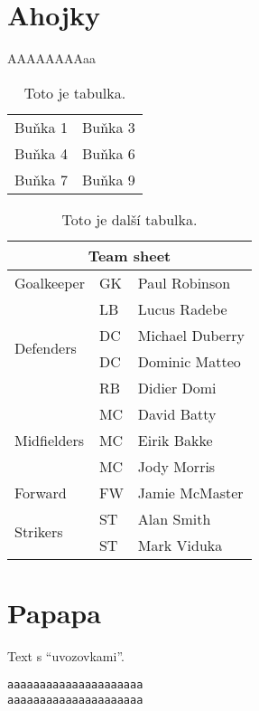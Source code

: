 \documentclass[a4paper,12pt]{article}
\begin{document}
\upmaketitle
\upthanksanot
\uptableofcontents
\upprintlists

\section{Ahojky}
AAAAAAAAaa

\begin{table}[ht]
  \begin{center}
    \begin{tabular}{||l|r||}
      Buňka 1 & Buňka 3 \\
      Buňka 4 & Buňka 6 \\
      Buňka 7 & Buňka 9 \\
      \hline
    \end{tabular}
    \caption{Toto je tabulka.}
  \end{center}
\end{table}
\begin{table}
\begin{center}
\begin{tabular}{|l|l|l|}
\hline
\multicolumn{3}{|c|}{Team sheet} \\
\hline
 Goalkeeper & GK & Paul Robinson \\ \hline
\multirow{4}{*}{Defenders} & LB & Lucus Radebe \\
  & DC & Michael Duberry \\
  & DC & Dominic Matteo \\
  & RB & Didier Domi \\ \hline
\multirow{3}{*}{Midfielders} & MC & David Batty \\
  & MC & Eirik Bakke \\
  & MC & Jody Morris \\ \hline
 Forward & FW & Jamie McMaster \\ \hline
\multirow{2}{*}{Strikers} & ST & Alan Smith \\
  & ST & Mark Viduka \\
\hline
\end{tabular}
\caption{Toto je další tabulka.}
\end{center}
\end{table}

\section{Papapa}
Text s \enquote{uvozovkami}.

\begin{lstlisting}[caption={Kód}]
aaaaaaaaaaaaaaaaaaaaa
aaaaaaaaaaaaaaaaaaaaa
\end{lstlisting}
\end{document}
